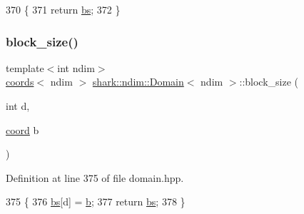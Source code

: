\begin{DoxyCode}
370                                                                    \{
371                         \textcolor{keywordflow}{return} \hyperlink{classshark_1_1ndim_1_1_domain_a2be17b3d153f7fbbede6eec0afd17ebe}{bs};
372                 \}
\end{DoxyCode}
\hypertarget{classshark_1_1ndim_1_1_domain_a13bdc44128a355f84ecb7c057f4a735e}{}\label{classshark_1_1ndim_1_1_domain_a13bdc44128a355f84ecb7c057f4a735e} 
\subsubsection{\texorpdfstring{block\+\_\+size()}{block\_size()}\hspace{0.1cm}{\footnotesize\ttfamily [3/4]}}
{\footnotesize\ttfamily template$<$int ndim$>$ \\
\hyperlink{structshark_1_1ndim_1_1coords}{coords}$<$ ndim $>$ \hyperlink{classshark_1_1ndim_1_1_domain}{shark\+::ndim\+::\+Domain}$<$ ndim $>$\+::block\+\_\+size (\begin{DoxyParamCaption}\item[{int}]{d,  }\item[{\hyperlink{namespaceshark_a767a92d5dd82cb82266473bff42fa6d9}{coord}}]{b }\end{DoxyParamCaption})\hspace{0.3cm}{\ttfamily [inline]}}



Definition at line 375 of file domain.\+hpp.


\begin{DoxyCode}
375                                                                            \{
376                     \hyperlink{classshark_1_1ndim_1_1_domain_a2be17b3d153f7fbbede6eec0afd17ebe}{bs}[d] = \hyperlink{classshark_1_1ndim_1_1_domain_a3b9ed7ea09cc2d90575a43f92cc4e105}{b};
377                     \textcolor{keywordflow}{return} \hyperlink{classshark_1_1ndim_1_1_domain_a2be17b3d153f7fbbede6eec0afd17ebe}{bs};
378                 \}
\end{DoxyCode}
\hypertarget{classshark_1_1ndim_1_1_domain_ac30400283240054ed6b01289a5b21b7f}{}\label{classshark_1_1ndim_1_1_domain_ac30400283240054ed6b01289a5b21b7f} 
